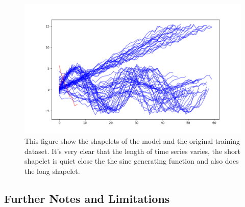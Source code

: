 \begin{figure}[h!]
	\centering
	\includegraphics[width=0.9\linewidth]{../Statistical_Sciences_template/figure/Shapelet and Train Set.png}
	\caption{This figure show the shapelets of the model and the original training dataset. It's very clear that the length of time series varies, the short shapelet is quiet close the the sine generating function and also does the long shapelet.}
	\label{fig:shapetrain}
\end{figure}
\subsection{Further Notes and Limitations}\label{subsec:limit}

